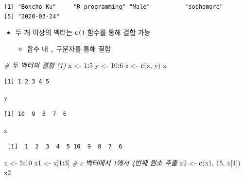 \documentclass[
  11pt,
]{krantz}
\newenvironment{Shaded}{\begin{snugshade}}{\end{snugshade}}
\newcommand{\CommentTok}[1]{\textcolor[rgb]{0.37,0.37,0.37}{\textit{#1}}}
\newcommand{\DecValTok}[1]{\textcolor[rgb]{0.06,0.06,0.06}{#1}}
\newcommand{\KeywordTok}[1]{\textcolor[rgb]{0.27,0.27,0.27}{\textbf{#1}}}
\newcommand{\NormalTok}[1]{#1}
\newcommand{\OperatorTok}[1]{\textcolor[rgb]{0.43,0.43,0.43}{\textbf{#1}}}
\newcommand{\StringTok}[1]{\textcolor[rgb]{0.5,0.5,0.5}{#1}}
\providecommand{\tightlist}{%
  \setlength{\itemsep}{0pt}\setlength{\parskip}{0pt}}
\begin{document}
\begin{verbatim}
[1] "Boncho Ku"     "R programming" "Male"          "sophomore"    
[5] "2020-03-24"   
\end{verbatim}

\normalsize

\begin{itemize}
\tightlist
\item
  두 개 이상의 벡터는 \texttt{c()} 함수를 통해 결합 가능

  \begin{itemize}
  \tightlist
  \item
    함수 내 \texttt{,} 구분자를 통해 결합
  \end{itemize}
\end{itemize}

\footnotesize

\begin{Shaded}
\begin{Highlighting}[]
\CommentTok{# 두 벡터의 결합 (1)}
\NormalTok{x <-}\StringTok{ }\DecValTok{1}\OperatorTok{:}\DecValTok{5}
\NormalTok{y <-}\StringTok{ }\DecValTok{10}\OperatorTok{:}\DecValTok{6}
\NormalTok{z <-}\StringTok{ }\KeywordTok{c}\NormalTok{(x, y)}
\NormalTok{x}
\end{Highlighting}
\end{Shaded}

\begin{verbatim}
[1] 1 2 3 4 5
\end{verbatim}

\begin{Shaded}
\begin{Highlighting}[]
\NormalTok{y}
\end{Highlighting}
\end{Shaded}

\begin{verbatim}
[1] 10  9  8  7  6
\end{verbatim}

\begin{Shaded}
\begin{Highlighting}[]
\NormalTok{z}
\end{Highlighting}
\end{Shaded}

\begin{verbatim}
 [1]  1  2  3  4  5 10  9  8  7  6
\end{verbatim}

\begin{Shaded}
\begin{Highlighting}[]
\NormalTok{x <-}\StringTok{ }\DecValTok{5}\OperatorTok{:}\DecValTok{10}
\NormalTok{x1 <-}\StringTok{ }\NormalTok{x[}\DecValTok{1}\OperatorTok{:}\DecValTok{3}\NormalTok{] }\CommentTok{# x 벡터에서 1에서 4번째 원소 추출}
\NormalTok{x2 <-}\StringTok{ }\KeywordTok{c}\NormalTok{(x1, }\DecValTok{15}\NormalTok{, x[}\DecValTok{4}\NormalTok{])}
\NormalTok{x2}
\end{Highlighting}
\end{Shaded}
\end{document}
